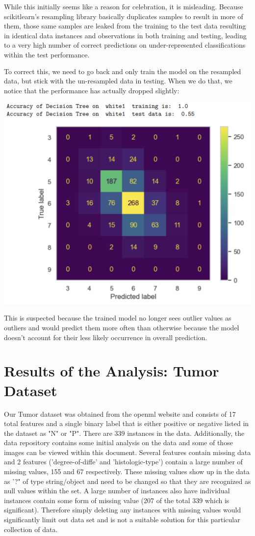 \documentclass[titlepage]{article}
\begin{document}
While this initially seems like a reason for celebration, it is misleading.  Because scikitlearn's resampling library basically duplicates samples to result in more of them, those same samples are leaked from the training to the test data resulting in identical data instances and observations in both training and testing, leading to a very high number of correct predictions on under-represented classifications within the test performance.  

To correct this, we need to go back and only train the model on the resampled data, but stick with the un-resampled data in testing.  When we do that, we notice that the performance has actually dropped slightly:  
\newline
\begin{center}
	\includegraphics[width=.5\textwidth]{img/resamplematrixnodataleak.png}
\end{center}

This is suspected because the trained model no longer sees outlier values as outliers and would predict them more often than otherwise because the model doesn't account for their less likely occurrence in overall prediction.  


\section*{Results of the Analysis: Tumor Dataset}
Our Tumor dataset was obtained from the openml website \cite{dataset1} and consists of 17 total features and a single binary label that is either positive or negative listed in the dataset as "N" or "P".  There are 339 instances in the data.  Additionally, the data repository contains some initial analysis on the data and some of those images can be viewed within this document. Several features contain missing data and 2 features ('degree-of-diffe' and 'histologic-type') contain a large number of missing values, 155 and 67 respectively. These missing values show up in the data as '?" of type string/object and need to be changed so that they are recognized as null values within the set.  A large number of instances also have individual instances contain some form of missing value (207 of the total 339 which is significant). Therefore simply deleting any instances with missing values would significantly limit out data set and is not a suitable solution for this particular collection of data.  
\end{document}
